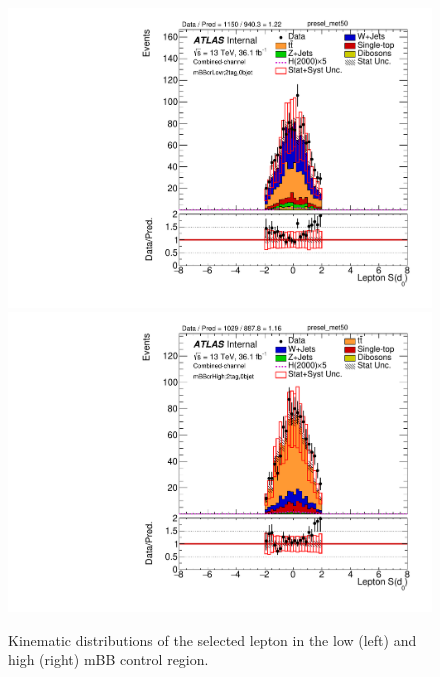 \begin{figure}[!h]
\begin{center}
\includegraphics[scale=0.33]{./figures/boosted/PlotByMbbRegions/DataMC_2tag_0bjet_mbbcrLow_lepton_presel_met50_Lep_d0sigL}                                                                          
\includegraphics[scale=0.33]{./figures/boosted/PlotByMbbRegions/DataMC_2tag_0bjet_mbbcrHigh_lepton_presel_met50_Lep_d0sigL}                                                                         
\caption{Kinematic distributions of the selected lepton in the low (left) and high (right) mBB control region.}
\label{fig:boosted_mbbcrHighLow_lepton}
\end{center}
\end{figure}


